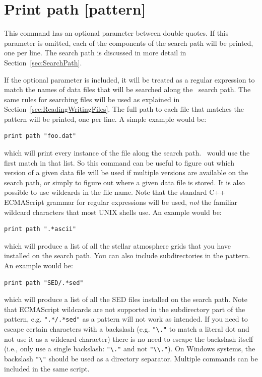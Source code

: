 \section{Print path [pattern]}
\label{sec:PrintPath}

This command has an optional parameter between double quotes. If this
parameter is omitted, each of the components of the search path will be
printed, one per line. The search path is discussed in more detail in
Section~\ref{sec:SearchPath}.

If the optional parameter is included, it will be treated as a regular
expression to match the names of data files that will be searched along the
\Cloudy\ search path. The same rules for searching files will be used as
explained in Section~\ref{sec:ReadingWritingFiles}. The full path to each file
that matches the pattern will be printed, one per line. A simple example would
be:
\begin{verbatim}
print path "foo.dat"
\end{verbatim}
which will print every instance of the file  along the
search path. \Cloudy\ would use the first match in that list. So this command
can be useful to figure out which version of a given data file will be used if
multiple versions are available on the search path, or simply to figure out
where a given data file is stored. It is also possible to use wildcards in the
file name. Note that the standard C++ ECMAScript grammar for regular
expressions will be used, {\em not} the familiar wildcard characters that most
UNIX shells use. An example would be:
\begin{verbatim}
print path ".*ascii"
\end{verbatim}
which will produce a list of all the stellar atmosphere grids that you have
installed on the search path. You can also include subdirectories in the pattern.
An example would be:
\begin{verbatim}
print path "SED/.*sed"
\end{verbatim}
which will produce a list of all the SED files installed on the search path.
Note that ECMAScript wildcards are not supported in the subdirectory part of
the pattern, e.g. \verb!".*/.*sed"! as a pattern will not work as intended. If
you need to escape certain characters with a backslash (e.g. \verb!"\."! to
match a literal dot and not use it as a wildcard character) there is no need
to escape the backslash itself (i.e., only use a single backslash: \verb!"\."!
and not \verb!"\\."!). On Windows systems, the backslash \verb!"\"! should be
used as a directory separator. Multiple  commands can be
included in the same script.


